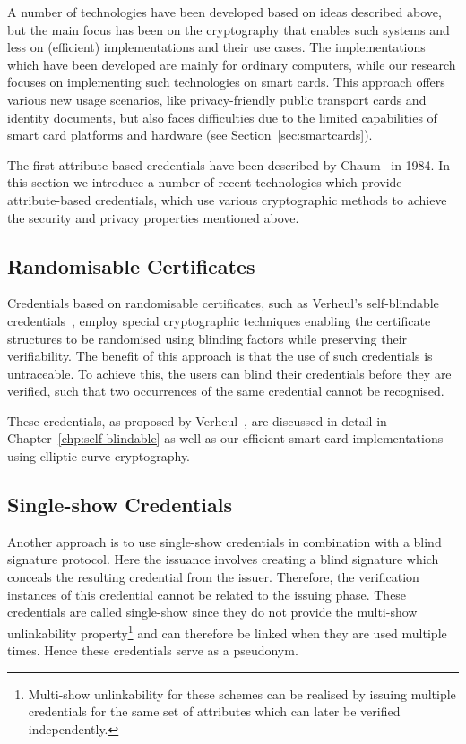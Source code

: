 A number of technologies have been developed based on ideas described above, but
the main focus has been on the cryptography that enables such systems and less
on (efficient) implementations and their use cases. The implementations which
have been developed are mainly for ordinary computers, while our research
focuses on implementing such technologies on smart cards. This approach offers
various new usage scenarios, like privacy-friendly public transport cards and
identity documents, but also faces difficulties due
to the limited capabilities of smart card platforms and hardware (see
Section~\ref{sec:smartcards}).

The first attribute-based credentials have been described by
Chaum~\cite{Chaum1985} in 1984. In this section we introduce a number of recent
technologies which provide attribute-based credentials, which use various
cryptographic methods to achieve the security and privacy properties mentioned
above.

\subsection{Randomisable Certificates}

Credentials based on randomisable certificates,
such as Verheul's self-blindable credentials~\cite{Verheul01}, employ special
cryptographic techniques enabling the certificate structures to be randomised
using blinding factors while preserving their verifiability. The benefit of this
 approach is that the use of such credentials is
untraceable. To achieve this, the users can blind their credentials before they
are verified, such that two occurrences of the same credential cannot be
recognised.

These credentials, as proposed by Verheul~\cite{Verheul01}, are discussed in
detail in Chapter~\ref{chp:self-blindable} as well as our efficient smart card
implementations~\cite{BatinaHJMV10,HoepmanJV10} using elliptic curve
cryptography.

\subsection{Single-show Credentials}

Another approach is to use single-show credentials in combination with a blind signature protocol. Here the issuance involves creating a blind signature which
conceals the resulting credential from the issuer. Therefore, the verification
instances of this credential cannot be related to the issuing phase. These
credentials are called single-show since they do not provide the multi-show
unlinkability property\footnote{Multi-show unlinkability for these schemes can
be realised by issuing multiple credentials for the same set of attributes which
can later be verified independently.} and can therefore be linked when they are
used multiple times. Hence these credentials serve as a pseudonym.

